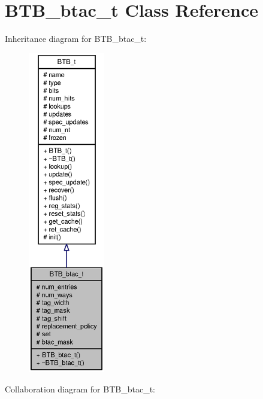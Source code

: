 \section{BTB\_\-btac\_\-t Class Reference}
\label{classBTB__btac__t}
Inheritance diagram for BTB\_\-btac\_\-t:\nopagebreak
\begin{figure}[H]
\begin{center}
\leavevmode
\includegraphics[height=400pt]{classBTB__btac__t__inherit__graph}
\end{center}
\end{figure}
Collaboration diagram for BTB\_\-btac\_\-t:\nopagebreak
